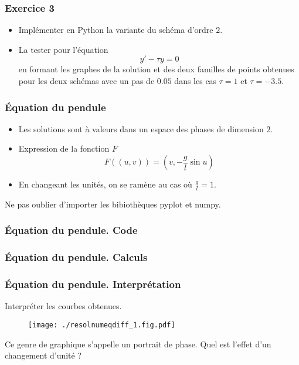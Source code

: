 \begin{frame}
  \frametitle{Exercice 3}
\begin{itemize}
  \item Implémenter en Python la variante du schéma d'ordre $2$.
  \item La tester pour l'équation
\begin{equation*}
  y' - \tau y =0
\end{equation*}
en formant les graphes de la solution et des deux familles de points obtenues pour les deux schémas avec un pas de $0.05$ dans les cas $\tau=1$ et $\tau=-3.5$.
\end{itemize}
\end{frame}

\begin{frame}
  \frametitle{\'Equation du pendule}
\begin{itemize}
  \item Les solutions sont à valeurs dans un espace des phases de dimension $2$.
  \item Expression de la fonction $F$
\begin{displaymath}
  F((u,v)) = (v,-\frac{g}{l}\sin u)
\end{displaymath}
  \item En changeant les unités, on se ramène au cas où $\frac{g}{l}=1$. 
\end{itemize}
Ne pas oublier d'importer les bibiothèques pyplot et numpy.
\end{frame}

\begin{frame}
  \frametitle{\'Equation du pendule. Code}

\end{frame}

\begin{frame}
  \frametitle{\'Equation du pendule. Calculs}

\end{frame}

\begin{frame}
  \frametitle{\'Equation du pendule. Interprétation}
Interpréter les courbes obtenues.
\begin{figure}[H]
  \centering
  \texttt{[image: ./resolnumeqdiff\_1.fig.pdf]}
\end{figure}
Ce genre de graphique s'appelle un portrait de phase.\newline
Quel est l'effet d'un changement d'unité ?
\end{frame}


